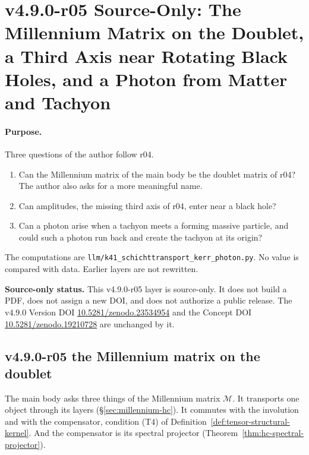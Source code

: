 \clearpage
\section*{v4.9.0-r05 Source-Only: The Millennium Matrix on the Doublet, a Third Axis near Rotating Black Holes, and a Photon from Matter and Tachyon}
\label{sec:v490-r05-layer-transport-kerr-photon}

\paragraph{Purpose.}
Three questions of the author follow r04.
\begin{enumerate}[leftmargin=2em]
\item Can the Millennium matrix of the main body be the doublet matrix of r04?  The author also asks for a more
meaningful name.
\item Can amplitudes, the missing third axis of r04, enter near a black hole?
\item Can a photon arise when a tachyon meets a forming massive particle, and could such a photon run back and create
the tachyon at its origin?
\end{enumerate}
The computations are \texttt{llm/k41\_schichttransport\_kerr\_photon.py}.  No value is compared with data.  Earlier
layers are not rewritten.

\noindent\textbf{Source-only status.}
This v4.9.0-r05 layer is source-only.  It does not build a PDF, does not assign a new DOI,
and does not authorize a public release.  The v4.9.0 Version DOI
\href{https://doi.org/10.5281/zenodo.23534954}{10.5281/zenodo.23534954} and the Concept DOI
\href{https://doi.org/10.5281/zenodo.19210728}{10.5281/zenodo.19210728} are unchanged by it.

\subsection*{v4.9.0-r05 the Millennium matrix on the doublet}
\label{subsec:v490-r05-millennium}

The main body asks three things of the Millennium matrix \(\mathcal M\).  It transports one object through its layers
(\S\ref{sec:millennium-hc}).  It commutes with the involution and with the compensator, condition (T4) of
Definition~\ref{def:tensor-structural-kernel}.  And the compensator is its spectral projector
(Theorem~\ref{thm:hc-spectral-projector}).

